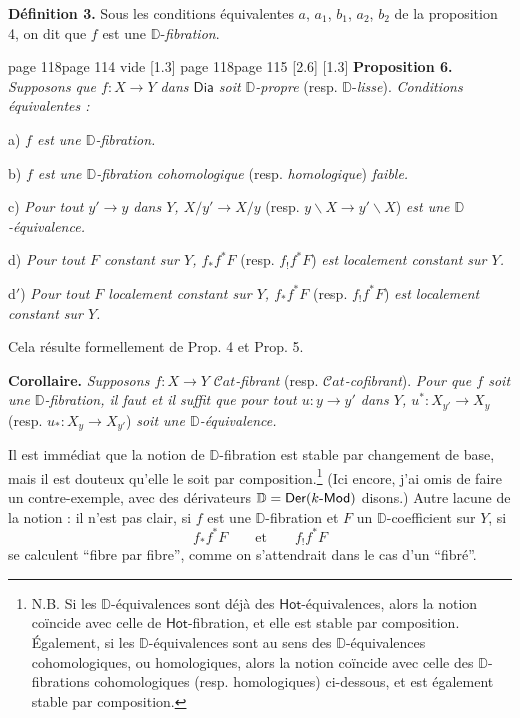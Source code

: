 \documentclass[11pt,leqno]{article}
\newcommand{\printedpage}[1]{\marginnote{\scriptsize\sffamily ed.\ #1}}
\newcommand{\msp}[1]{%
  \begingroup\def\thismsp{#1}\def\blankmsp{page 114 vide}%
  \ifx\thismsp\blankmsp
    \marginnote{\scriptsize\sffamily [114: vide]}[1.3\baselineskip]%
  \else\def\followingmsp{page 115}%
    \ifx\thismsp\followingmsp
      \marginnote{\scriptsize\sffamily [page 115]}[2.6\baselineskip]%
    \else\marginnote{\scriptsize\sffamily [#1]}[1.3\baselineskip]\fi
  \fi\endgroup}
\newcommand{\Dia}{\ensuremath{\mathsf{Dia}}}
\newcommand{\Hot}{\ensuremath{\mathsf{Hot}}}
\newcommand{\D}{\ensuremath{\mathbb{D}}}
\newcommand{\Cat}{\ensuremath{\mathcal{C}at}}
\newcommand{\sfup}[1]{\textsf{\upshape #1}}
\begin{document}
\textbf{Définition 3.} Sous les conditions équivalentes $a$, $a_1$, $b_1$, $a_2$, $b_2$ de la proposition 4, on dit que $f$ est une $\D$-\textit{fibration}. %

\msp{page 118}\textbf{Proposition 6.} \textit{Supposons que $f : X \to Y$ dans \Dia{} soit $\D$-propre} (resp. $\D$-\textit{lisse}). \textit{Conditions équivalentes :}

a) \textit{$f$ est une $\D$-fibration.}

b) \textit{$f$ est une $\D$-fibration cohomologique} (resp. \textit{homologique}) \textit{faible.}

c) \textit{Pour tout $y' \to y$ dans $Y$, $X/y' \to X/y$} (resp. $y\backslash X \to y'\backslash X$) \textit{est une $\D$-équivalence.}

d) \textit{Pour tout $F$ constant sur $Y$, $f_*f^*F$} (resp. $f_!f^*F$) \textit{est localement constant sur $Y$.}

d$'$) \textit{Pour tout $F$ localement constant sur $Y$, $f_*f^*F$} (resp. $f_!f^*F$) \textit{est localement constant sur $Y$.}

Cela résulte formellement de Prop. 4 et Prop. 5.

\textbf{Corollaire.} \textit{Supposons $f : X \to Y$} \Cat\textit{-fibrant} (resp. \Cat\textit{-cofibrant}). \textit{Pour que $f$ soit une $\D$-fibration, il faut et il suffit que pour tout $u : y \to y'$ dans $Y$, $u^* : X_{y'} \to X_y$} (resp. $u_* : X_y \to X_{y'}$) \textit{soit une $\D$-équivalence.}

Il est immédiat que la notion de $\D$-fibration est stable par changement de base, mais il est douteux qu'elle le soit par composition.\footnote[60]{N.B. Si les $\D$-équivalences sont déjà des \Hot-équivalences, alors la notion coïncide avec celle de \Hot-fibration, et elle est stable par composition. Également, si les $\D$-équivalences sont au sens des $\D$-équivalences cohomologiques, ou homologiques, alors la notion coïncide avec celle des $\D$-fibrations cohomologiques (resp. homologiques) ci-dessous, et est également stable par composition.} (Ici encore, j'ai omis de faire un contre-exemple, avec des dérivateurs $\D = \sfup{Der}(k\text{-}\sfup{Mod})$ disons.) Autre lacune de la notion : il n'est pas clair, si $f$ est une $\D$-fibration et $F$ un $\D$-coefficient sur $Y$, si
\[
f_*f^*F \qquad \text{et} \qquad f_!f^*F
\]
\printedpage{71}
se calculent “fibre par fibre”, comme on s'attendrait dans le cas d'un “fibré”.
\end{document}
